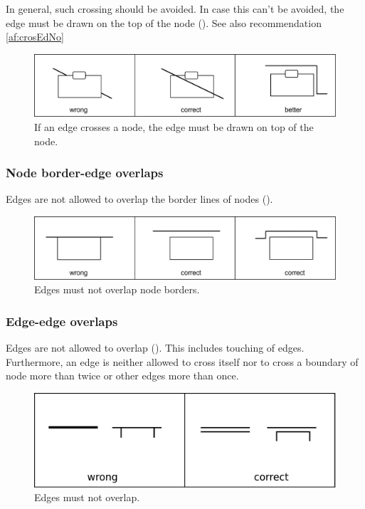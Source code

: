 In general, such crossing should be avoided.  In case this can't be avoided, the edge must be drawn on the top of the node (). See also recommendation \ref{af:crosEdNo} 

\begin{figure}[h!]
  \centering
  \includegraphics[scale=0.4]{images/layout-node-edge}
  \caption{If an edge crosses a node, the edge must be drawn on top  of the node.}\label{fig:af:layout2}
\end{figure}

\subsubsection{Node border-edge overlaps}

Edges are not allowed to overlap the border lines of nodes ().

\begin{figure}[h!]
  \centering
  \includegraphics[scale=0.4]{images/layout-node-border-edge}
  \caption{Edges must not overlap node borders.}\label{fig:af:layout3}
\end{figure}

\subsubsection{Edge-edge overlaps}

Edges are not allowed to overlap (). This includes touching of edges. Furthermore, an edge is neither allowed to cross itself nor to cross
a boundary of node more than twice or other edges more than once.

\begin{figure}[h!]
  \centering
  \includegraphics[scale=0.4]{images/layout-edge-edge}
  \caption{Edges must not overlap.}\label{fig:af:layout4}
\end{figure}

